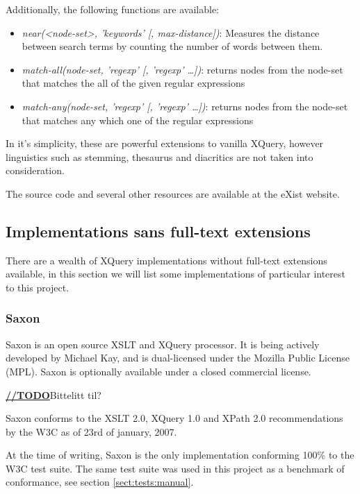 Additionally, the following functions are available:
\begin{itemize}
  \item \emph{near(<node-set>, 'keywords' [, max-distance])}: Measures the 
  distance between search terms by counting the number of words between 
  them.
  \item \emph{match-all(node-set, 'regexp' [, 'regexp' \ldots])}: returns
  nodes from the node-set that matches the all of the given regular expressions 
  \item \emph{match-any(node-set, 'regexp' [, 'regexp' \ldots])}: returns nodes
  from the node-set that matches any which one of the regular expressions
\end{itemize}

In it's simplicity, these are powerful extensions to vanilla XQuery, however
linguistics such as stemming, thesaurus and diacritics are not taken into
consideration.

The source code and several other resources are available at the eXist
website\cite{existweb}. 

\subsection{Implementations sans full-text extensions}
There are a wealth of XQuery implementations without full-text
extensions available, in this section we will list some implementations of
particular interest to this project.
\subsubsection{Saxon}
Saxon is an open source XSLT and XQuery processor. It is being actively
developed by Michael Kay, and is dual-licensed under the Mozilla Public License
(MPL). Saxon is optionally available under a closed commercial license.

\underline{\textbf{\LARGE //TODO}}Bittelitt til?

Saxon conforms to the XSLT 2.0, XQuery 1.0 and XPath 2.0 recommendations
by the W3C as of 23rd of january, 2007. 

At the time of writing, Saxon is the only implementation conforming 100\% to
the W3C test suite\cite{w3ctestresults}. The same test suite was used in this
project as a benchmark of conformance, see section \ref{sect:tests:manual}.


